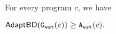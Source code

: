 {\begin{thm}
    \label{thm:adaptalg_soundness}
    For every program $c$, we have
\begin{center}
$
\mathsf{AdaptBD}(\mathtt{{G_{est}}}({c})) \geq {\ensuremath{\mathtt{A_{est}}}}(c).
$
\end{center}
\end{thm}
}





